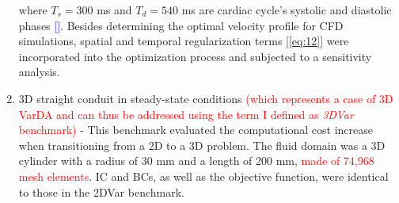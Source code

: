 \begin{enumerate}
where \( T_s = 300 \) ms and \( T_d = 540 \) ms are cardiac cycle's systolic and diastolic phases \textcolor{blue}{[\cite{Katz1977}].} Besides determining the optimal velocity profile for CFD simulations, spatial and temporal regularization terms [\cref{eq:12}] were incorporated into the optimization process and subjected to a sensitivity analysis.\\
%
%
    \item 3D straight conduit in steady-state conditions \textcolor{red}{(which represents a case of 3D VarDA and can thus be addressed using the term I defined as \emph{3DVar} benchmark)} - This benchmark evaluated the computational cost increase when transitioning from a 2D to a 3D problem. The fluid domain was a 3D cylinder with a radius of 30 mm and a length of 200 mm, \textcolor{red}{made of 74,968 mesh elements}. IC and BCs, as well as the objective function, were identical to those in the 2DVar benchmark.

\end{enumerate}
